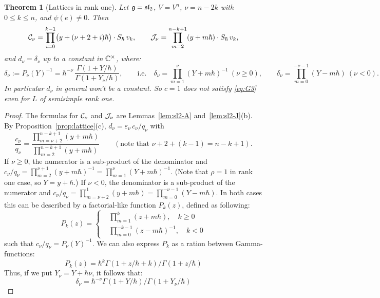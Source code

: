 \documentclass{article}
\theoremstyle{plain}
\newtheorem{theorem}{Theorem}[section]
\theoremstyle{definition}
\theoremstyle{remark}
\numberwithin{equation}{section}
\begin{document}
\begin{theorem}[Lattices in rank one]\label{thm:rank-one}
Let $\mathfrak{g}=\mathfrak{sl}_2$, $V=V^n$, $\nu=n-2k$ with $0\le k\le n$, and $\psi(e)\neq0$. Then
\[
\mathcal C_\nu=\prod_{i=0}^{k-1}\bigl(y+(\nu+2+i)\hbar\bigr)\cdot S_\hbar\,v_k,\qquad
\mathcal J_\nu=\prod_{m=2}^{n-k+1}(y+m\hbar)\cdot S_\hbar\,v_k,
\]
and $d_\nu=\delta_\nu$ up to a constant in $\mathbb{C}^\times$, where:
\[
\delta_\nu:=P_\nu(Y)^{-1}=\hbar^{-\nu}\,\frac{\Gamma(1+Y/\hbar)}{\Gamma(1+Y_\nu/\hbar)},\qquad\text{i.e.}\quad
\delta_\nu=\prod_{m=1}^{\nu}(Y+m\hbar)^{-1}\ (\nu\ge0),\qquad\delta_\nu=\prod_{m=0}^{-\nu-1}(Y-m\hbar)\ (\nu<0).
\]
In particular $d_\nu$ in general won't be a constant. So $c=1$ does not satisfy \eqref{eq:G3} even for $L$ of semisimple rank one.
\end{theorem}

\begin{proof}
The formulas for $\mathcal C_\nu$ and $\mathcal J_\nu$ are Lemmas~\ref{lem:sl2-A} and~\ref{lem:sl2-J}(b). By Proposition~\ref{prop:lattice}(c), $d_\nu=\varepsilon_\nu\,c_\nu/q_\nu$ with
\[
\frac{c_\nu}{q_\nu}=\frac{\prod_{m=\nu+2}^{n-k+1}(y+m\hbar)}{\prod_{m=2}^{n-k+1}(y+m\hbar)}\qquad(\text{note that  } \nu+2+(k-1)=n-k+1).
\]
If $\nu\ge0$, the numerator is a sub-product of the denominator and $c_\nu/q_\nu=\prod_{m=2}^{\nu+1}(y+m\hbar)^{-1}=\prod_{m=1}^{\nu}(Y+m\hbar)^{-1}$. (Note that $\rho =1$ in rank one case, so $Y = y + \hbar$.) If $\nu<0$, the denominator is a sub-product of the numerator and $c_\nu/q_\nu=\prod_{m=\nu+2}^{1}(y+m\hbar)=\prod_{m=0}^{-\nu-1}(Y-m\hbar)$. In both cases this can be described by a factorial-like function $P_{k}(z)$, defined as following:
\begin{equation*}
    P_k(z)= \left\{
\begin{aligned}
    & \prod_{m=1}^{k}(z+m\hbar), \quad k\geq 0\\
    & \prod_{m=0}^{-k-1} (z-m\hbar)^{-1}, \quad k<0
\end{aligned}
\right.
\end{equation*}
such that  $ c_\nu /q_\nu =P_\nu(Y)^{-1}$. We can also express $P_k$ as a ration between Gamma-functions:
\begin{equation*}
    P_k(z)=\hbar^k\Gamma(1+z/\hbar+k)/\Gamma(1+z/\hbar)
\end{equation*}
Thus, if we put $Y_\nu=Y+\hbar\nu$, it follows that:
\begin{equation*}
    \delta_\nu = \hbar^{-\nu} \Gamma(1+Y/\hbar)/\Gamma(1+Y_\nu /\hbar)
\end{equation*}
\end{proof}
\end{document}
